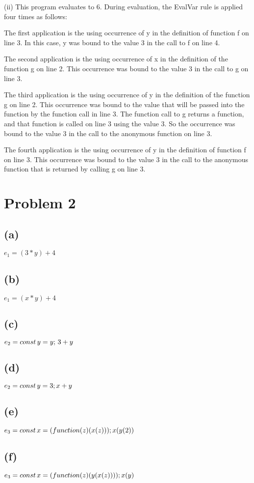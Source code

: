 \documentclass[11pt, oneside]{article}
\begin{document}
\par (ii) This program evaluates to 6. During evaluation, the EvalVar rule is applied four times as follows:
\par The first application is the using occurrence of y in the definition of function f on line 3. In this case, y was bound to the value 3 in the call to f on line 4.
\par The second application is the using occurrence of x in the definition of the function g on line 2. This occurrence was bound to the value 3 in the call to g on line 3.
\par The third application is the using occurrence of y in the definition of the function g on line 2. This occurrence was bound to the value that will be passed into the function by the function call in line 3. The function call to g returns a function, and that function is called on line 3 using the value 3. So the occurrence was bound to the value 3 in the call to the anonymous function on line 3.
\par The fourth application is the using occurrence of y in the definition of function f on line 3. This occurrence was bound to the value 3 in the call to the anonymous function that is returned by calling g on line 3. 

\section{Problem 2}
\subsection*{(a)} $e_1 = (3 * y) + 4$

\subsection*{(b)} $e_1 = (x * y) + 4$

\subsection*{(c)} $e_2 = const \thinspace y = y; \thinspace 3 + y$

\subsection*{(d)} $e_2 = const \thinspace y = 3; x + y$

\subsection*{(e)} $e_3 = const \thinspace x = (function (z) (x(z))); x(y(2))$

\subsection*{(f)} $e_3 = const \thinspace x = (function (z) (y(x(z)))); x(y)$
\end{document}
